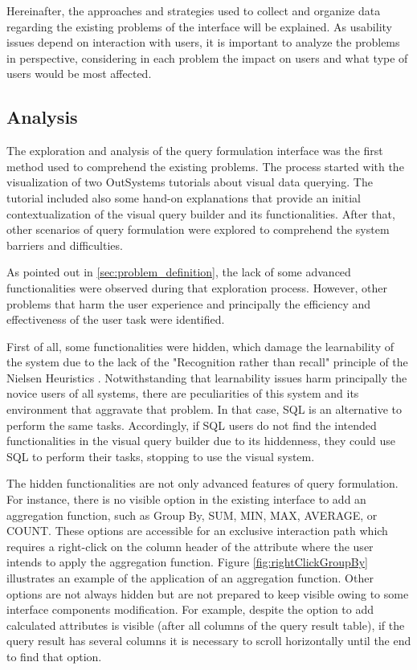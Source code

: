 Hereinafter, the approaches and strategies used to collect and organize data regarding the existing problems of the interface will be explained. As usability issues depend on interaction with users, it is important to analyze the problems in perspective, considering in each problem the impact on users and what type of users would be most affected.

\subsection{Analysis}
\label{subsec:analysis}

The exploration and analysis of the query formulation interface was the first method used to comprehend the existing problems. The process started with the visualization of two OutSystems tutorials \cite{outsystems_tutorial_aggregates_101, outsystems_tutorial_advanced_aggregates} about visual data querying. The tutorial included also some hand-on explanations that provide an initial contextualization of the visual query builder and its functionalities. After that, other scenarios of query formulation were explored to comprehend the system barriers and difficulties.

As pointed out in \ref{sec:problem_definition}, the lack of some advanced functionalities were observed during that exploration process. However, other problems that harm the user experience and principally the efficiency and effectiveness of the user task were identified.

First of all, some functionalities were hidden, which damage the learnability of the system due to the lack of the "Recognition rather than recall" principle of the Nielsen Heuristics \cite{nielsen_heuristics}. Notwithstanding that learnability issues harm principally the novice users of all systems, there are peculiarities of this system and its environment that aggravate that problem. In that case, SQL is an alternative to perform the same tasks. Accordingly, if SQL users do not find the intended functionalities in the visual query builder due to its hiddenness, they could use SQL to perform their tasks, stopping to use the visual system.

The hidden functionalities are not only advanced features of query formulation. For instance, there is no visible option in the existing interface to add an aggregation function, such as Group By, SUM, MIN, MAX, AVERAGE, or COUNT. These options are accessible for an exclusive interaction path which requires a right-click on the column header of the attribute where the user intends to apply the aggregation function. Figure \ref{fig:rightClickGroupBy} illustrates an example of the application of an aggregation function. Other options are not always hidden but are not prepared to keep visible owing to some interface components modification. For example, despite the option to add calculated attributes is visible (after all columns of the query result table), if the query result has several columns it is necessary to scroll horizontally until the end to find that option.

